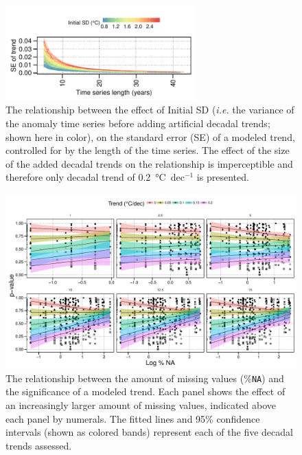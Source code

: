 \documentclass[]{ametsoc}
\begin{document}
\begin{figure}
\centering \includegraphics[width=0.65\textwidth]{figure06}
\caption{The relationship between the effect of Initial SD (\emph{i.e.} the variance of the anomaly time series before adding artificial decadal trends; shown here in color), on the standard error (SE) of a modeled trend, controlled for by the length of the time series. The effect of the size of the added decadal trends on the relationship is imperceptible and therefore only decadal trend of \SI{0.2}{\degreeCelsius}~dec$^{-1}$ is presented.}
\label{figure06}
\end{figure}

\begin{figure}
\centering \includegraphics[width=1.0\textwidth]{figure07}
\caption{The relationship between the amount of missing values (\%\texttt{NA}) and the significance of a modeled trend. Each panel shows the effect of an increasingly larger amount of missing values, indicated above each panel by numerals. The fitted lines and 95\% confidence intervals (shown as colored bands) represent each of the five decadal trends assessed.}
\label{figure07}
\end{figure}
\end{document}
